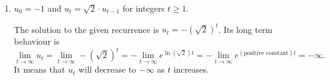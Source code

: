\documentclass[../main.tex]{subfiles}
\begin{document}
\begin{exercise}
\begin{enumerate}
    \item \(u_{0} = -1\) and \(u_{t} = \sqrt{2} \cdot u_{t-1}\) for integers \(t \ge 1\).

      \begin{solution}
        The solution to the given recurrence is \(u_{t} = - \left(\sqrt{2} \right)^{t}\).  Its long term behaviour is 
        \[
          \lim_{t \to \infty} u_{t} = \lim_{t \to \infty} -\left( \sqrt{2} \right)^{t} = - \lim_{t \to \infty} e^{\ln(\sqrt{2})t} = -\lim_{t \to \infty} e^{(\text{positive constant}) t} = -\infty.
        \]
        It means that \(u_{t}\) will decrease to \(-\infty\) as \(t\) increases.
      \end{solution}
  \end{enumerate}
\end{exercise}

%
\end{document}
